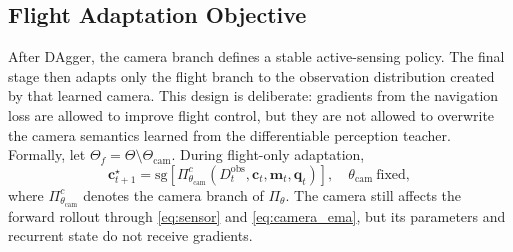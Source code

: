 \documentclass[letterpaper,journal]{IEEEtran}
\begin{document}
\subsection{Flight Adaptation Objective}
After DAgger, the camera branch defines a stable active-sensing policy. The
final stage then adapts only the flight branch to the observation distribution
created by that learned camera. This design is deliberate: gradients from the
navigation loss are allowed to improve flight control, but they are not allowed
to overwrite the camera semantics learned from the differentiable perception
teacher. Formally, let
$\Theta_f=\Theta\setminus\Theta_{\mathrm{cam}}$. During flight-only
adaptation,
\begin{equation}
    \mathbf{c}_{t+1}^{\star}
    =
    \mathrm{sg}\!\left[
    \Pi_{\theta_{\mathrm{cam}}}^{c}
    (D_t^{\mathrm{obs}},\mathbf{c}_t,\mathbf{m}_t,\mathbf{q}_t)
    \right],
    \quad
    \theta_{\mathrm{cam}}\ \mathrm{fixed},
    \label{eq:frozen_camera_forward}
\end{equation}
where $\Pi_{\theta_{\mathrm{cam}}}^{c}$ denotes the camera branch of
$\Pi_\theta$. The camera still affects the forward rollout through
\eqref{eq:sensor} and \eqref{eq:camera_ema}, but its parameters and recurrent
state do not receive gradients.
\end{document}
